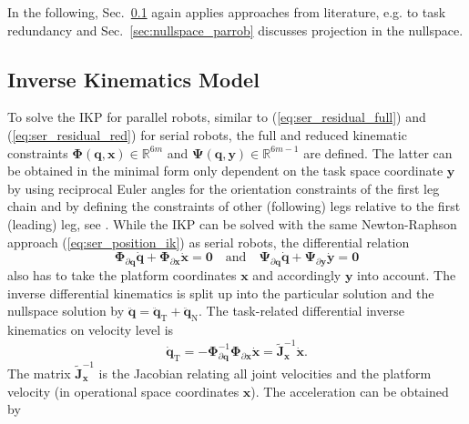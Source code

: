 \documentclass[a4paper,twoside]{article}
\begin{document}
In the following, Sec.~\ref{sec:ikp_parrob} again applies approaches from literature, e.g. \cite{Merlet2006a,ChiaveriniOriWal2008} to task redundancy and Sec.~\ref{sec:nullspace_parrob} discusses projection in the nullspace.

\subsection{Inverse Kinematics Model}
\label{sec:ikp_parrob}


To solve the IKP for parallel robots, similar to (\ref{eq:ser_residual_full}) and (\ref{eq:ser_residual_red}) for serial robots, the full and reduced kinematic constraints $\bm{\Phi}(\bm{q},\bm{x}){\in}\mathbb{R}^{6m}$ and $\bm{\Psi}(\bm{q},\bm{y}){\in}\mathbb{R}^{6m-1}$ are defined.
The latter can be obtained in the minimal form only dependent on the task space coordinate $\bm{y}$ by using reciprocal Euler angles for the orientation constraints of the first leg chain and by defining the constraints of other (following) legs relative to the first (leading) leg, see \cite{SchapplerTapOrt2019}.
While the IKP can be solved with the same Newton-Raphson approach (\ref{eq:ser_position_ik}) as serial robots, the
differential relation 
\begin{equation}
\bm{\Phi}_{\partial \bm{q}} \dot{\bm{q}} + \bm{\Phi}_{\partial \bm{x}} \dot{\bm{x}} = \bm{0}
\quad \mathrm{and} \quad
\bm{\Psi}_{\partial \bm{q}} \dot{\bm{q}} + \bm{\Psi}_{\partial \bm{y}} \dot{\bm{y}} = \bm{0}
\label{equ:par_differential_constraints}
\end{equation}
also has to take the platform coordinates $\bm{x}$ and accordingly $\bm{y}$ into account.
The inverse differential kinematics is split up into the particular solution and the nullspace solution by $\ddot{\bm{q}}=\ddot{\bm{q}}_{\mathrm{T}}+\ddot{\bm{q}}_{\mathrm{N}}$.
The task-related differential inverse kinematics on velocity level is
\begin{equation}
\dot{\bm{q}}_{\mathrm{T}}=-\bm{\Phi}_{\partial \bm{q}}^{-1} \bm{\Phi}_{\partial \bm{x}}\dot{\bm{x}} = \tilde{\bm{J}}_{\bm{x}}^{-1}\dot{\bm{x}}.
\label{equ:parrob_def_jinv_full}
\end{equation}
The matrix $\tilde{\bm{J}}_{\bm{x}}^{-1}$ is the Jacobian relating all joint velocities and the platform velocity (in operational space coordinates $\bm{x}$).
The acceleration can be obtained by
\end{document}
